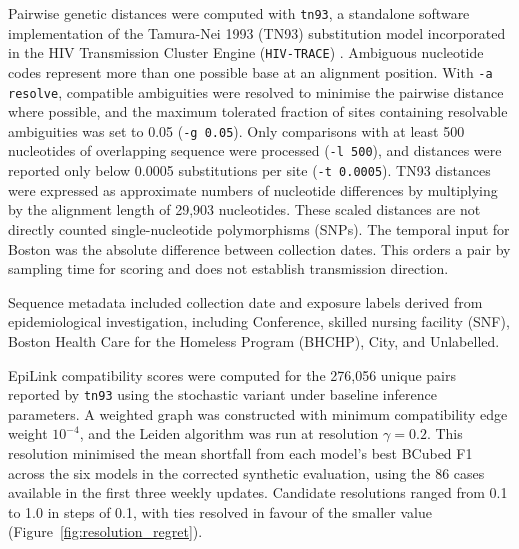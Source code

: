 Pairwise genetic distances were computed with \texttt{tn93}, a standalone software implementation of the Tamura-Nei 1993 (TN93) substitution model \citep{TamuraNei1993} incorporated in the HIV Transmission Cluster Engine (\texttt{HIV-TRACE}) \citep{KosakovskyPond2018}. Ambiguous nucleotide codes represent more than one possible base at an alignment position. With \texttt{-a resolve}, compatible ambiguities were resolved to minimise the pairwise distance where possible, and the maximum tolerated fraction of sites containing resolvable ambiguities was set to 0.05 (\texttt{-g 0.05}). Only comparisons with at least 500 nucleotides of overlapping sequence were processed (\texttt{-l 500}), and distances were reported only below 0.0005 substitutions per site (\texttt{-t 0.0005}). TN93 distances were expressed as approximate numbers of nucleotide differences by multiplying by the alignment length of 29,903 nucleotides. These scaled distances are not directly counted single-nucleotide polymorphisms (SNPs). The temporal input for Boston was the absolute difference between collection dates. This orders a pair by sampling time for scoring and does not establish transmission direction.

Sequence metadata included collection date and exposure labels derived from epidemiological investigation, including Conference, skilled nursing facility (SNF), Boston Health Care for the Homeless Program (BHCHP), City, and Unlabelled.

EpiLink compatibility scores were computed for the 276,056 unique pairs reported by \texttt{tn93} using the stochastic variant under baseline inference parameters. A weighted graph was constructed with minimum compatibility edge weight $10^{-4}$, and the Leiden algorithm was run at resolution $\gamma=0.2$. This resolution minimised the mean shortfall from each model's best BCubed F1 across the six models in the corrected synthetic evaluation, using the 86 cases available in the first three weekly updates. Candidate resolutions ranged from 0.1 to 1.0 in steps of 0.1, with ties resolved in favour of the smaller value (Figure~\ref{fig:resolution_regret}).

